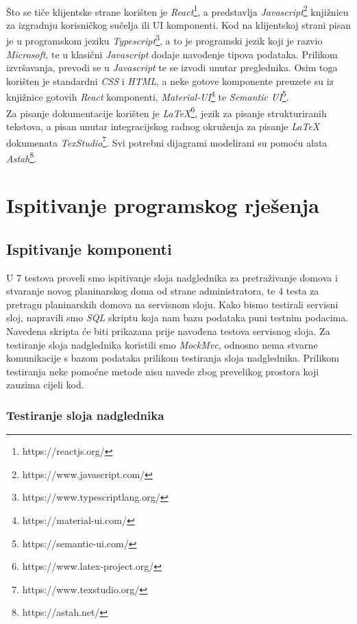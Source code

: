 			  \\Što se tiče klijentske strane korišten je \textit{React}\footnote{https://reactjs.org/}, a predstavlja \textit{Javascript}\footnote{https://www.javascript.com/} knjižnicu za izgradnju korisničkog sučelja ili UI komponenti. Kod na klijentskoj strani pisan je u programskom jeziku \textit{Typescript}\footnote{https://www.typescriptlang.org/}, a to je programski jezik koji je razvio \textit{Microsoft}, te u klasični \textit{Javascript} dodaje navođenje tipova podataka. Prilikom izvršavanja, prevodi se u \textit{Javascript} te se izvodi unutar preglednika. Osim toga korišten je standardni \textit{CSS} i \textit{HTML}, a neke gotove komponente preuzete su iz knjižnice gotovih \textit{React} komponenti, \textit{Material-UI}\footnote{https://material-ui.com/} te \textit{Semantic UI}\footnote{https://semantic-ui.com/}.\\
			  Za pisanje dokumentacije korišten je \textit{LaTeX}\footnote{https://www.latex-project.org/}, jezik za pisanje strukturiranih tekstova, a pisan unutar integracijskog radnog okruženja za pisanje \textit{LaTeX} dokumenata \textit{TexStudio}\footnote{https://www.texstudio.org/}. Svi potrebni dijagrami modelirani su pomoću alata \textit{Astah}\footnote{https://astah.net/}.
			 		
			\eject 
		
	
		\section{Ispitivanje programskog rješenja}
			
			\subsection{Ispitivanje komponenti}
			U 7 testova proveli smo ispitivanje sloja nadglednika za pretraživanje domova i stvaranje novog planinarskog doma od strane administratora, te 4 testa za pretragu planinarskih domova na servisnom sloju. Kako bismo testirali servisni sloj, napravili smo \textit{SQL} skriptu koja nam bazu podataka puni testnim podacima. Navedena skripta će biti prikazana prije navođena testova servisnog sloja.
			Za testiranje sloja nadglednika koristili smo \textit{MockMvc}, odnosno nema stvarne komunikacije s bazom podataka prilikom testiranja sloja nadglednika. Prilikom testiranja neke pomoćne metode nisu navede zbog prevelikog prostora koji zauzima cijeli kod.\\
			
			\subsubsection{Testiranje sloja nadglednika}
			
